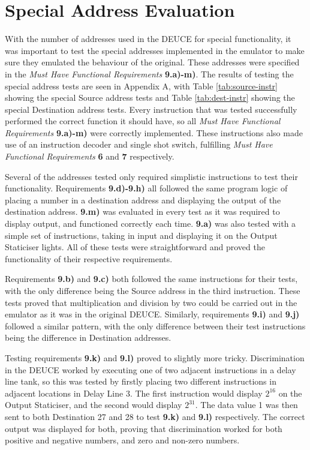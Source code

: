 \documentclass{l4proj}
\begin{document}
\section{Special Address Evaluation}
With the number of addresses used in the DEUCE for special functionality, it was important to test the special addresses implemented in the emulator to make sure they emulated the behaviour of the original. These addresses were specified in the \textit{Must Have Functional Requirements} \textbf{9.a)-m)}. The results of testing the special address tests are seen in Appendix A, with Table \ref{tab:source-instr} showing the special Source address tests and Table \ref{tab:dest-instr} showing the special Destination address tests. Every instruction that was tested successfully performed the correct function it should have, so all \textit{Must Have Functional Requirements} \textbf{9.a)-m)} were correctly implemented. These instructions also made use of an instruction decoder and single shot switch, fulfilling \textit{Must Have Functional Requirements} \textbf{6} and \textbf{7} respectively.

Several of the addresses tested only required simplistic instructions to test their functionality. Requirements \textbf{9.d)-9.h)} all followed the same program logic of placing a number in a destination address and displaying the output of the destination address. \textbf{9.m)} was evaluated in every test as it was required to display output, and functioned correctly each time. \textbf{9.a)} was also tested with a simple set of instructions, taking in input and displaying it on the Output Staticiser lights. All of these tests were straightforward and proved the functionality of their respective requirements.

Requirements \textbf{9.b)} and \textbf{9.c)} both followed the same instructions for their tests, with the only difference being the Source address in the third instruction. These tests proved that multiplication and division by two could be carried out in the emulator as it was in the original DEUCE. Similarly, requirements \textbf{9.i)} and \textbf{9.j)} followed a similar pattern, with the only difference between their test instructions being the difference in Destination addresses.

Testing requirements \textbf{9.k)} and \textbf{9.l)} proved to slightly more tricky. Discrimination in the DEUCE worked by executing one of two adjacent instructions in a delay line tank, so this was tested by firstly placing two different instructions in adjacent locations in Delay Line 3. The first instruction would display $ 2^{16} $ on the Output Staticiser, and the second would display $ 2^{31} $. The data value 1 was then sent to both Destination 27 and 28 to test \textbf{9.k)} and \textbf{9.l)} respectively. The correct output was displayed for both, proving that discrimination worked for both positive and negative numbers, and zero and non-zero numbers.
\end{document}
